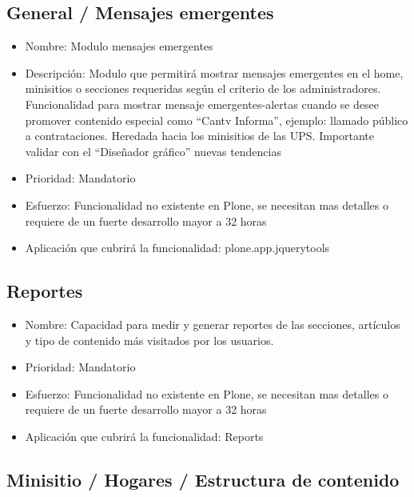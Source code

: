 \documentclass[11pt, letterpaper, oneside, spanish]{scrbook}
\begin{document}
\subsection{General / Mensajes emergentes}
\label{sec-2-1-45}

\begin{itemize}
\item Nombre: Modulo mensajes emergentes
\item Descripción: Modulo que permitirá mostrar mensajes emergentes en el home,
  minisitios o secciones requeridas según el criterio de los administradores.
  Funcionalidad para mostrar mensaje emergentes-alertas cuando se desee
  promover contenido especial como “Cantv Informa”, ejemplo: llamado público a
  contrataciones.  Heredada hacia los minisitios de las UPS. Importante
  validar con el “Diseñador gráfico” nuevas tendencias
\item Prioridad: Mandatorio
\item Esfuerzo: Funcionalidad no existente en Plone, se necesitan mas detalles o
  requiere de un fuerte desarrollo mayor a 32 horas
\item Aplicación que cubrirá la funcionalidad: plone.app.jquerytools
\end{itemize}
\subsection{Reportes}
\label{sec-2-1-46}

\begin{itemize}
\item Nombre: Capacidad para medir y generar reportes de las secciones, artículos
  y tipo de contenido más visitados por los usuarios.
\item Prioridad: Mandatorio
\item Esfuerzo: Funcionalidad no existente en Plone, se necesitan mas detalles o
  requiere de un fuerte desarrollo mayor a 32 horas
\item Aplicación que cubrirá la funcionalidad: Reports
\end{itemize}
\subsection{Minisitio / Hogares / Estructura de contenido}
\label{sec-2-1-47}
\end{document}
